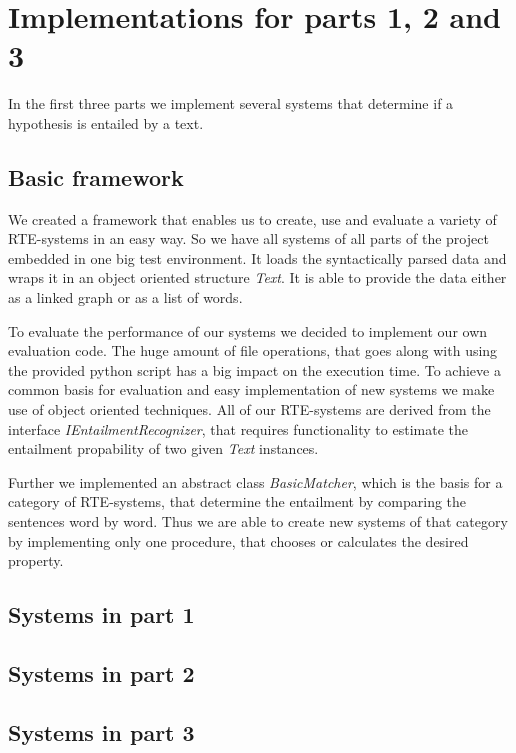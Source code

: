 
\section{Implementations for parts 1, 2 and 3}

In the first three parts we implement several systems that determine if 
a hypothesis is entailed by a text.


\subsection{Basic framework}

We created a framework that enables us to create, use and evaluate
a variety of RTE-systems in an easy way. So we have all systems of all parts
of the project embedded in one big test environment.
It loads the syntactically parsed data and wraps it in an object oriented structure 
\textit{Text}. It is able to provide the data either as a linked graph or as a 
list of words.

To evaluate the performance of our systems we decided to implement our own evaluation
code. The huge amount of file operations, that goes along with using the provided 
python script has a big impact on the execution time.
To achieve a common basis for evaluation and easy implementation of new systems we make use of 
object oriented techniques. All of our RTE-systems are derived from the interface
\textit{IEntailmentRecognizer}, that requires functionality to estimate the entailment
propability of two given \textit{Text} instances.

Further we implemented an abstract class \textit{BasicMatcher}, which is the basis for a
category of RTE-systems, that determine the entailment by comparing the sentences word by word.
Thus we are able to create new systems of that category by implementing only one procedure, 
that chooses or calculates the desired property.

\subsection{Systems in part 1}
\subsection{Systems in part 2}
\subsection{Systems in part 3}


